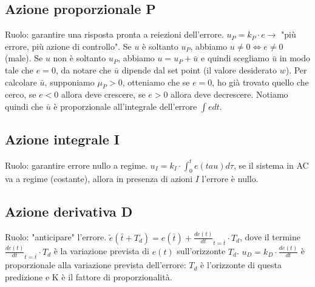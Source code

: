 \begin{landscape}
\begin{multicols*}{2}
    \subsection{Azione proporzionale P}
    Ruolo: garantire una risposta pronta a reiezioni dell'errore. \newline
    \newline
    $u_P = k_P \cdot e \rightarrow $ "più errore, più azione di controllo".\newline
    Se $u$ è soltanto $u_P$, abbiamo $u \neq 0 \Leftrightarrow e \neq 0$ (male).\newline
    Se $u$ non è soltanto $u_P$, abbiamo $u = u_P + \bar{u}$ e quindi scegliamo $\bar{u}$ in modo tale che $e = 0$, da notare che $\bar{u}$ dipende dal set point (il valore desiderato $w$).\newline
    Per calcolare $\bar{u}$, supponiamo $\mu_P > 0$, otteniamo che se $e= 0$, ho già trovato quello che cerco, se $e<0$ allora deve crescere, se $e>0$ allora deve decrescere. Notiamo quindi che $\bar{u}$ è proporzionale all'integrale dell'errore $\int e dt$.
    \subsection{Azione integrale I}
    Ruolo: garantire errore nullo a regime. \newline
    \newline
    $u_I = k_I \cdot \int_{0}^{t} e (tau) d \tau$, se il sistema in AC va a regime (costante), allora in presenza di azioni $I$ l'errore è nullo.
    \subsection{Azione derivativa D}
    Ruolo: "anticipare" l'errore.\newline
    \newline
    $\tilde{e}(\bar{t} + T_d) = e(\bar{t}) + \frac{d e(t)}{dt}_{t= \bar{t}} \cdot T_d$, dove il termine $\frac{d e(t)}{dt}_{t= \bar{t}} \cdot T_d$ è la variazione prevista di $e(t)$ sull'orizzonte $T_d$.\newline
    \newline
    $u_D =  k_D \cdot \frac{d e (t)}{dt}$ è proporzionale alla variazione prevista dell'errore: $T_d$ è l'orizzonte di questa predizione e K è il fattore di proporzionalità.

\end{multicols*}
\end{landscape}
